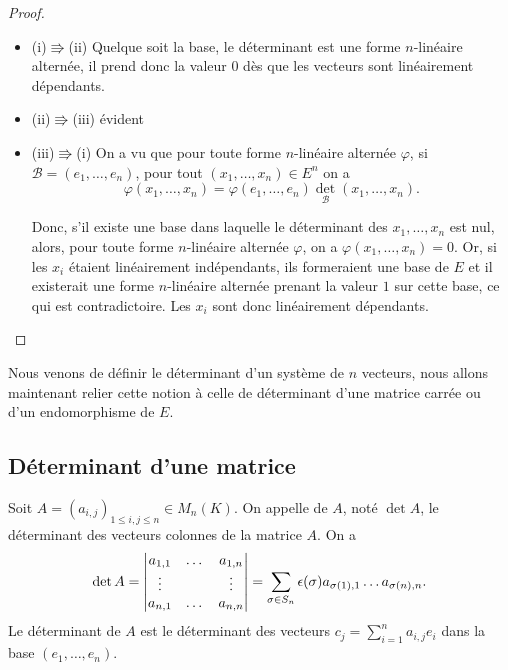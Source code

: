 \documentclass[class=report,crop=false]{standalone}
\begin{document}
\begin{proof}
\begin{itemize}
  \item (i)$\Rrightarrow$(ii) Quelque soit la base, le déterminant est une 
forme $n$-linéaire alternée, il prend donc la valeur $0$ dès que les 
vecteurs sont linéairement dépendants.
  
  \item (ii)$\Rrightarrow$(iii) évident
  
  \item (iii)$\Rrightarrow$(i) On a vu que pour toute forme $n$-linéaire alternée 
$\varphi$, si $\mathcal{B}=(e_1,\dots,e_n)$, pour tout $(x_1,\dots,x_n)\in E^n$ on a
$$\varphi(x_1,\dots,x_n)=\varphi(e_1,\dots,e_n){\det} _\mathcal{B}(x_1,\dots,x_n).$$


Donc, s'il existe une base dans laquelle le déterminant des $x_1,\dots,x_n$ 
est nul, alors, pour toute forme $n$-linéaire alternée $\varphi$, on a 
$\varphi(x_1,\dots,x_n)=0$. Or, si les $x_i$ étaient linéairement indépendants, 
ils formeraient une base de $E$ et il existerait une forme $n$-linéaire alternée 
prenant la valeur $1$ sur cette base, ce qui est contradictoire. Les $x_i$ sont 
donc linéairement dépendants.
\end{itemize}

\end{proof}


Nous venons de définir le déterminant d'un système de $n$ vecteurs, 
nous allons maintenant relier cette notion à celle de déterminant 
d'une matrice carrée ou d'un endomorphisme de $E$.


\subsection{Déterminant d'une matrice}


\begin{definition}
Soit $A=(a_{i,j})_{1\leq i,j\leq n}\in M_n(K)$. On appelle  de $A$, noté
 $\det A$, le déterminant des vecteurs colonnes de la matrice $A$. On a
$$\det A=\left|\begin{matrix}a_{1,1} &\dots &a_{1,n}\cr
\vdots & &\vdots\cr a_{n,1} &\dots & a_{n,n}\end{matrix}\right|=
\sum_{\sigma\in S_n}\epsilon(\sigma)a_{\sigma(1),1}\dots a_{\sigma(n),n}.$$
Le déterminant de $A$ est le déterminant des vecteurs
$c_j=\sum_{i=1}^{n}a_{i,j}e_i$
dans la base $(e_1,\dots,e_n).$  
\end{definition} 
\end{document}
